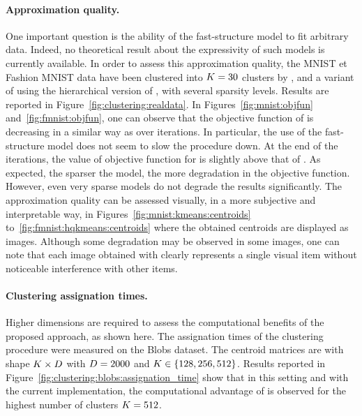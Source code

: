 \paragraph{Approximation quality.} One important question is the ability of the fast-structure model to fit arbitrary data.
Indeed, no theoretical result about the expressivity of such models is currently available.
In order to assess this approximation quality, the MNIST et Fashion MNIST data have been clustered into $K=30$ clusters by \kmeans, \qkmeans and a variant of \qkmeans using the hierarchical version of \palm, with several sparsity levels.
Results are reported in Figure~\ref{fig:clustering:realdata}.
In Figures~\ref{fig:mnist:objfun} and~\ref{fig:fmnist:objfun}, one can observe that the objective function of \qkmeans is decreasing in a similar way as \kmeans over iterations.
In particular, the use of the fast-structure model does not seem to slow the procedure down.
At the end of the iterations, the value of objective function for \qkmeans is slightly above that of \kmeans.
As expected, the sparser the model, the more degradation in the objective function.
However, even very sparse models do not degrade the results significantly.
The approximation quality can be assessed visually, in a more subjective and interpretable way, in Figures~\ref{fig:mnist:kmeans:centroids} to~\ref{fig:fmnist:hqkmeans:centroids} where the obtained centroids are displayed as images.
Although some degradation may be observed in some images, one can note that each image obtained with \qkmeans clearly represents a single visual item without noticeable interference with other items.

\paragraph{Clustering assignation times.}
Higher dimensions are required to assess the computational benefits of the proposed approach, as shown here.
The assignation times of the clustering procedure were measured on the Blobs dataset.
The centroid matrices are with shape $K \times D$ with $D=2000$  and $K\in\left \lbrace 128, 256, 512\right \rbrace$.
Results reported in Figure~\ref{fig:clustering:blobs:assignation_time} show that in this setting and with the current implementation, the computational advantage of \qkmeans is observed for the highest number of clusters $K=512$.



